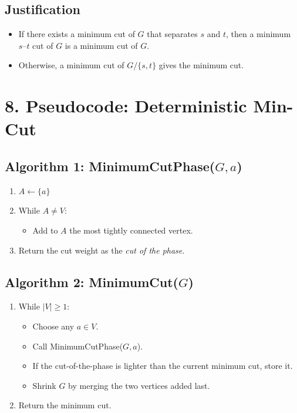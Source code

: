\documentclass[12pt]{article}
\begin{document}
\subsection*{Justification}

\begin{itemize}
    \item If there exists a minimum cut of \( G \) that separates \( s \) and \( t \), then a minimum \( s\text{–}t \) cut of \( G \) is a minimum cut of \( G \).
    \item Otherwise, a minimum cut of \( G / \{s, t\} \) gives the minimum cut.
\end{itemize}

\section*{8. Pseudocode: Deterministic Min-Cut}

\subsection*{Algorithm 1: MinimumCutPhase(\(G, a\))}

\begin{enumerate}
    \item \( A \leftarrow \{a\} \)
    \item While \( A \neq V \):
    \begin{itemize}
        \item Add to \( A \) the most tightly connected vertex.
    \end{itemize}
    \item Return the cut weight as the \emph{cut of the phase}.
\end{enumerate}

\subsection*{Algorithm 2: MinimumCut(\(G\))}

\begin{enumerate}
    \item While \( |V| \ge 1 \):
    \begin{itemize}
        \item Choose any \( a \in V \).
        \item Call MinimumCutPhase(\(G, a\)).
        \item If the cut-of-the-phase is lighter than the current minimum cut, store it.
        \item Shrink \( G \) by merging the two vertices added last.
    \end{itemize}
    \item Return the minimum cut.
\end{enumerate}
\end{document}
